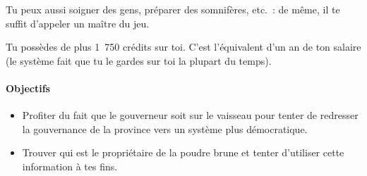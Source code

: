 {{Tu peux aussi soigner des gens, préparer des somnifères, etc.~: de même, il te suffit d’appeler un maître du jeu.

Tu possèdes de plus 1~750 crédits sur toi.
C’est l’équivalent d’un an de ton salaire (le système fait que tu le gardes sur toi la plupart du temps).
}

\paragraph{Objectifs}{
\begin{itemize}
	\item Profiter du fait que le gouverneur soit sur le vaisseau pour tenter de redresser la gouvernance de la province vers un système plus démocratique.
	\item Trouver qui est le propriétaire de la poudre brune et tenter d’utiliser cette information à tes fins.
\end{itemize}
}
}

